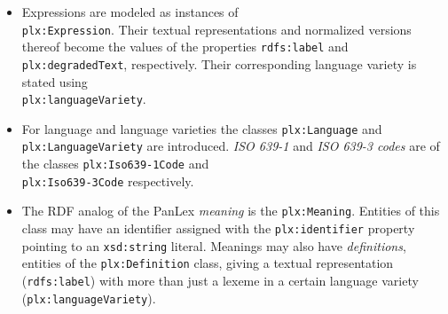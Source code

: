 \documentclass[sw]{iosart2c}
\begin{document}
\begin{itemize}
\item Expressions are modeled as instances of \\ \texttt{\small plx:Expression}. %
Their textual representations and normalized versions thereof become the 
values of the properties \texttt{\small rdfs:label} and \\ \texttt{\small plx:degradedText}, respectively. %
Their corresponding language variety is stated using \\ \texttt{\small plx:languageVariety}. %

\item For language and language varieties the classes
\texttt{\small plx:Language} and \texttt{\small plx:LanguageVariety} are introduced.
\emph{ISO 639-1} and \emph{ISO 639-3 codes} are of the classes
\texttt{\small plx:Iso639-1Code} and \\ \texttt{\small plx:Iso639-3Code} respectively. %

\item The RDF analog of the PanLex \emph{meaning} is the \texttt{\small plx:Meaning}.
Entities of this class may have an identifier assigned with the
\texttt{\small plx:identifier} property pointing to an \texttt{\small xsd:string} literal.
Meanings may also have \emph{definitions}, entities of the
\texttt{\small plx:Definition} class, giving a textual representation
(\texttt{\small rdfs:label}) with more than just a lexeme in a certain
language variety (\texttt{\small plx:languageVariety}).


\end{itemize}
\end{document}
